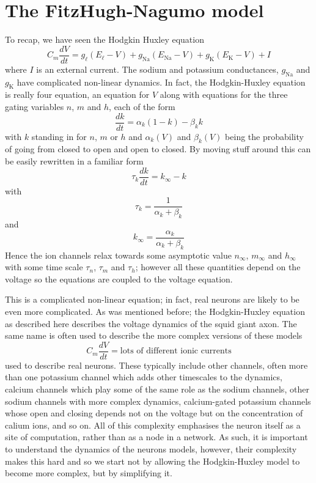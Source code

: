 \documentclass[12pt]{article}
\begin{document}
\section*{The FitzHugh-Nagumo model}
To recap, we have seen the Hodgkin Huxley equation
\begin{equation}
C_m\frac{dV}{dt}=g_\ell(E_{\ell}-V)+g_{\text{Na}}(E_{\text{Na}}-V)+g_{\text{K}}(E_{\text{K}}-V)+I
\end{equation}
where $I$ is an external current. The sodium and potassium conductances, $g_{\text{Na}}$ and
$g_{\text{K}}$ have complicated non-linear dynamics. In fact, the
Hodgkin-Huxley equation is really four equation, an equation for $V$
along with equations for the three gating variables $n$, $m$ and $h$, each of the form
\begin{equation}
\frac{dk}{dt}=\alpha_k(1-k)-\beta_k k
\end{equation}
with $k$ standing in for $n$, $m$ or $h$ and $\alpha_k(V)$ and $\beta_k(V)$
being the probability of going from closed to open and open to
closed. By moving stuff around this can be easily rewritten in a familiar form
\begin{equation}
\tau_k\frac{dk}{dt}=k_\infty - k
\end{equation}
with 
\begin{equation}
\tau_k=\frac{1}{\alpha_k+\beta_k}
\end{equation}
and
\begin{equation}
k_\infty=\frac{\alpha_k}{\alpha_k+\beta_k}
\end{equation}
Hence the ion channels relax towards some asymptotic value $n_\infty$,
$m_\infty$ and $h_\infty$ with some time scale $\tau_n$, $\tau_m$ and
$\tau_h$; however all these quantities depend on the voltage so the
equations are coupled to the voltage equation.

This is a complicated non-linear equation; in fact, real neurons are
likely to be even more complicated. As was mentioned before; the
Hodgkin-Huxley equation as described here describes the voltage
dynamics of the squid giant axon. The same name is often used to
describe the more complex versions of these models
\begin{equation}
C_m\frac{dV}{dt}=\mbox{lots of different ionic currents}
\end{equation}
used to describe real neurons. These typically include other channels,
often more than one potassium channel which adds other timescales to
the dynamics, calcium channels which play some of the same role as the
sodium channels, other sodium channels with more complex dynamics,
calcium-gated potassium channels whose open and closing depends not on
the voltage but on the concentration of calium ions, and so on. All of
this complexity emphasises the neuron itself as a site of computation,
rather than as a node in a network. As such, it is important to
understand the dynamics of the neurons models, however, their
complexity makes this hard and so we start not by allowing the
Hodgkin-Huxley model to become more complex, but by simplifying it.
\end{document}
